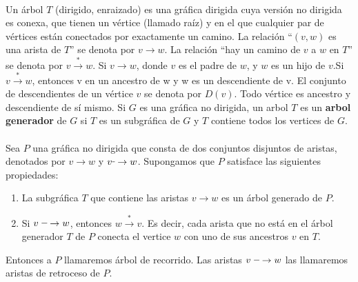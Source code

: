 \paragraph{}
Un árbol $T$ (dirigido, enraizado) es una gráfica dirigida cuya versión no dirigida es conexa, que tienen un vértice (llamado raíz) y en el que cualquier par de vértices están conectados por exactamente un camino. La relación ``$(v, w)$ es una arista de $T$'' se denota por $v \rightarrow w$. La relación ``hay un camino de $v$ a $w$ en $T$'' se denota por $v \overset{\ast}{\rightarrow}  w$. Si $v \rightarrow w$, donde $v$ es el padre de $w$, y $w$ es un hijo de $v$.Si $v \overset{\ast}{\rightarrow} w$, entonces v en un ancestro de w y w es un descendiente de v. El conjunto de descendientes de un vértice $v$ se denota por $D\left(v\right)$. Todo vértice es ancestro y descendiente de sí mismo. Si $G$ es una gráfica no dirigida, un arbol $T$ es un \textbf{arbol generador} de $G$ si $T$ es un subgráfica de $G$ y $T$ contiene todos los vertices de $G$.

\paragraph{}
Sea $P$ una gráfica no dirigida que consta de dos conjuntos disjuntos de aristas, denotados por $v \rightarrow w$ y $v \rule[1mm]{.1cm}{0.4pt} \rightarrow w$. Supongamos que $P$ satisface las siguientes propiedades:
\begin{enumerate}
\item La subgráfica $T$ que contiene las aristas $v \rightarrow w$ es un árbol generado de $P$.
\item Si $v~ \rule[1mm]{.2cm}{0.4pt} \rightarrow w$, entonces $w \overset{\ast}{\rightarrow}  v$. Es decir, cada arista que no está en el árbol generador $T$ de $P$ conecta el vertice $w$ con uno de sus ancestros $v$ en $T$.
\end{enumerate}
Entonces a $P$ llamaremos árbol de recorrido. Las aristas $v~ \rule[1mm]{.2cm}{0.4pt} \rightarrow w$ las llamaremos aristas de retroceso de $P$.

